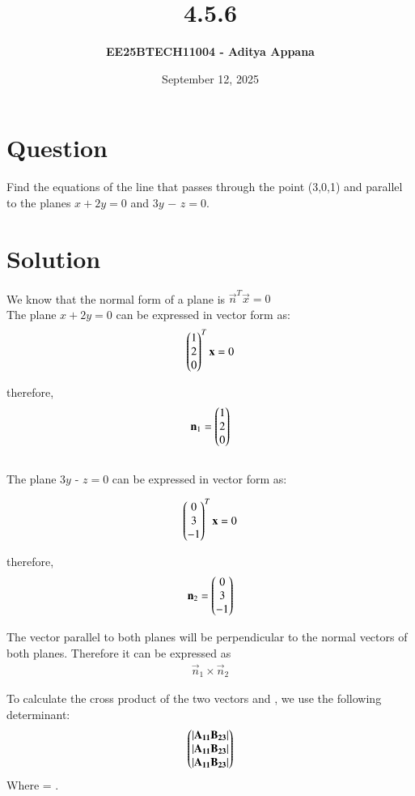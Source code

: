 \documentclass[12pt]{article}
\title{\textbf{4.5.6}}
\author{\textbf{EE25BTECH11004 - Aditya Appana}}
\date{September 12, 2025}
\begin{document}
\maketitle

\section*{Question}
Find the equations of the line that passes through the point (3,0,1) and parallel to the
planes $x + 2y = 0$ and $3y$ − $z = 0$.

\section*{Solution}

We know that the normal form of a plane is $\vec{n}^T\vec{x} = 0$ \\
The plane $x + 2y = 0$ can be expressed in vector form as:
\begin{align}
    \begin{pmatrix}1\\2\\0\end{pmatrix}^T\mathbf{x} = 0
\end{align} 

therefore, \begin{align}\mathbf{n}_1 = \begin{pmatrix}1\\2\\0\end{pmatrix}\end{align} \\
The plane $3y$ - $z=0$ can be expressed in vector form as:

\begin{align}
    \begin{pmatrix}0 \\ 3 \\-1\end{pmatrix}^T\mathbf{x} = 0
\end{align}

therefore, \begin{align}\mathbf{n}_2 = \begin{pmatrix}0\\3\\-1\end{pmatrix} \end{align}

The vector parallel to both planes will be perpendicular to the normal vectors of both planes. Therefore it can be expressed as
\begin{align} \vec{n}_1 \times \vec{n}_2 \end{align}

To calculate the cross product of the two vectors  and , we use the following determinant:
\begin{align}
\begin{pmatrix}|\mathbf{A_{11}} \mathbf{B_{23}}| \\ |\mathbf{A_{11}}   \mathbf{B_{23}}| \\ |\mathbf{A_{11}} \mathbf{B_{23}}| \end{pmatrix}
\end{align}
Where  = . \\
\end{document}
